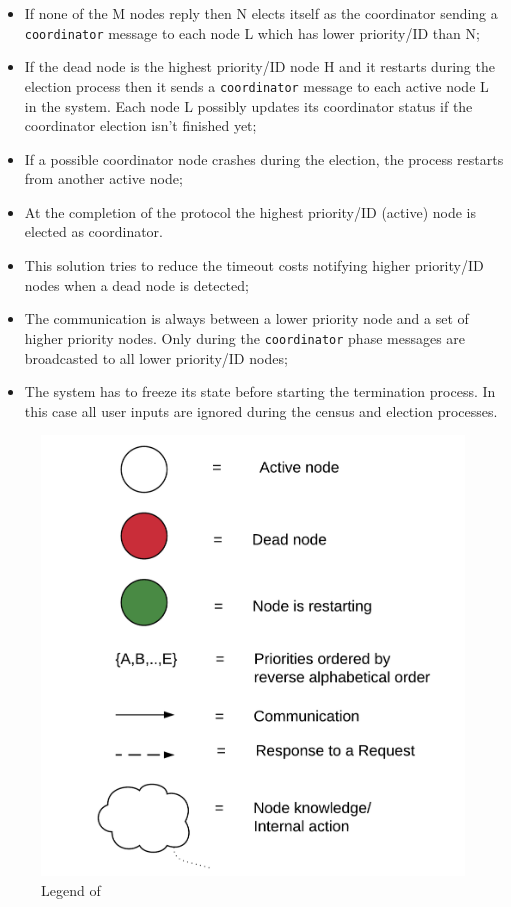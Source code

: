 \begin{itemize}
  \item If none of the M nodes reply then N elects itself as the coordinator sending a \texttt{coordinator} message to each node L which has lower priority/ID than N;
  \item If the dead node is the highest priority/ID node H and it restarts during the election process then it sends a \texttt{coordinator} message to each active node L in the system. Each node L possibly updates its coordinator status if the coordinator election isn't finished yet;
  \item If a possible coordinator node crashes during the election, the process restarts from another active node;
  \item At the completion of the protocol the highest priority/ID (active) node is elected as coordinator.
  \item This solution tries to reduce the timeout costs notifying higher priority/ID nodes when a dead node is detected;
  \item The communication is always between a lower priority node and a set of higher priority nodes. Only during the \texttt{coordinator} phase messages are broadcasted to all lower priority/ID nodes;
  \item The system has to freeze its state before starting the termination process. In this case all user inputs are ignored during the census and election processes.
\end{itemize}


\begin{figure}[H]
  \centering
  \includegraphics[width=0.6\columnwidth]{sections/images/solution/election_legend.pdf}
  \caption{Legend of }
  \label{fig:election-protocol-legend}
\end{figure}

